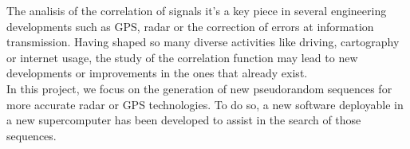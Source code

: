 The analisis of the correlation of signals it's a key piece in several
engineering developments such as GPS, radar or the correction of errors at
information transmission. Having shaped so many diverse activities like
driving, cartography or internet usage, the study of the correlation function
may lead to new developments or improvements in the ones that already exist.\\

In this project, we focus on the generation of new pseudorandom sequences for
more accurate radar or GPS technologies. To do so, a new software deployable in
a new supercomputer has been developed to assist in the search of those
sequences.
